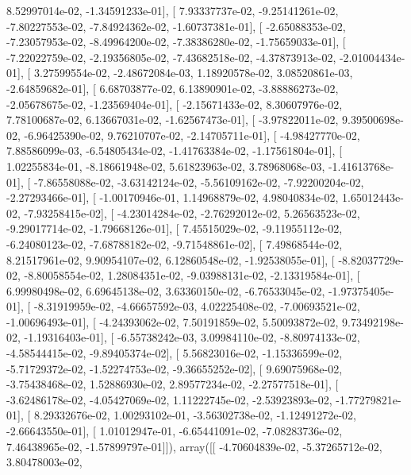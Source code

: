 \documentclass{article}
\begin{document}
          8.52997014e-02,  -1.34591233e-01],
       [  7.93337737e-02,  -9.25141261e-02,  -7.80227553e-02,
         -7.84924362e-02,  -1.60737381e-01],
       [ -2.65088353e-02,  -7.23057953e-02,  -8.49964200e-02,
         -7.38386280e-02,  -1.75659033e-01],
       [ -7.22022759e-02,  -2.19356805e-02,  -7.43682518e-02,
         -4.37873913e-02,  -2.01004434e-01],
       [  3.27599554e-02,  -2.48672084e-03,   1.18920578e-02,
          3.08520861e-03,  -2.64859682e-01],
       [  6.68703877e-02,   6.13890901e-02,  -3.88886273e-02,
         -2.05678675e-02,  -1.23569404e-01],
       [ -2.15671433e-02,   8.30607976e-02,   7.78100687e-02,
          6.13667031e-02,  -1.62567473e-01],
       [ -3.97822011e-02,   9.39500698e-02,  -6.96425390e-02,
          9.76210707e-02,  -2.14705711e-01],
       [ -4.98427770e-02,   7.88586099e-03,  -6.54805434e-02,
         -1.41763384e-02,  -1.17561804e-01],
       [  1.02255834e-01,  -8.18661948e-02,   5.61823963e-02,
          3.78968068e-03,  -1.41613768e-01],
       [ -7.86558088e-02,  -3.63142124e-02,  -5.56109162e-02,
         -7.92200204e-02,  -2.27293466e-01],
       [ -1.00170946e-01,   1.14968879e-02,   4.98040834e-02,
          1.65012443e-02,  -7.93258415e-02],
       [ -4.23014284e-02,  -2.76292012e-02,   5.26563523e-02,
         -9.29017714e-02,  -1.79668126e-01],
       [  7.45515029e-02,  -9.11955112e-02,  -6.24080123e-02,
         -7.68788182e-02,  -9.71548861e-02],
       [  7.49868544e-02,   8.21517961e-02,   9.90954107e-02,
          6.12860548e-02,  -1.92538055e-01],
       [ -8.82037729e-02,  -8.80058554e-02,   1.28084351e-02,
         -9.03988131e-02,  -2.13319584e-01],
       [  6.99980498e-02,   6.69645138e-02,   3.63360150e-02,
         -6.76533045e-02,  -1.97375405e-01],
       [ -8.31919959e-02,  -4.66657592e-03,   4.02225408e-02,
         -7.00693521e-02,  -1.00696493e-01],
       [ -4.24393062e-02,   7.50191859e-02,   5.50093872e-02,
          9.73492198e-02,  -1.19316403e-01],
       [ -6.55738242e-03,   3.09984110e-02,  -8.80974133e-02,
         -4.58544415e-02,  -9.89405374e-02],
       [  5.56823016e-02,  -1.15336599e-02,  -5.71729372e-02,
         -1.52274753e-02,  -9.36655252e-02],
       [  9.69075968e-02,  -3.75438468e-02,   1.52886930e-02,
          2.89577234e-02,  -2.27577518e-01],
       [ -3.62486178e-02,  -4.05427069e-02,   1.11222745e-02,
         -2.53923893e-02,  -1.77279821e-01],
       [  8.29332676e-02,   1.00293102e-01,  -3.56302738e-02,
         -1.12491272e-02,  -2.66643550e-01],
       [  1.01012947e-01,  -6.65441091e-02,  -7.08283736e-02,
          7.46438965e-02,  -1.57899797e-01]]), array([[ -4.70604839e-02,  -5.37265712e-02,   3.80478003e-02,
\end{document}
